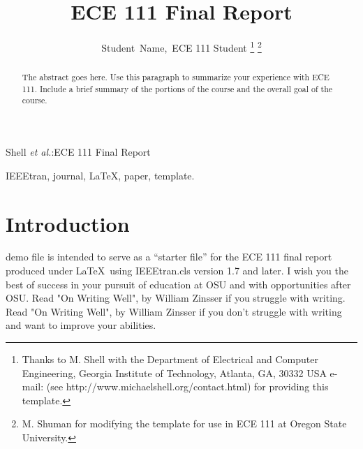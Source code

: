 \documentclass[journal]{IEEEtran}
\begin{document}
%
\title{ECE 111 Final Report}

\author{Student~Name,~ECE 111 Student
\thanks{Thanks to M. Shell with the Department
of Electrical and Computer Engineering, Georgia Institute of Technology, Atlanta,
GA, 30332 USA e-mail: (see http://www.michaelshell.org/contact.html) for providing this template.}%
\thanks{M. Shuman for modifying the template for use in ECE 111 at Oregon State University.}}

%
{Shell \MakeLowercase{\textit{et al.}}:ECE 111 Final Report}

\maketitle

\begin{abstract}
The abstract goes here.  Use this paragraph to summarize your experience with ECE 111.  Include a brief summary of the portions of the course and the overall goal of the course.
\end{abstract}

\begin{IEEEkeywords}
IEEEtran, journal, \LaTeX, paper, template.
\end{IEEEkeywords}

\section{Introduction}
% 
% 
% 
% 
 demo file is intended to serve as a ``starter file''
for the ECE 111 final report produced under \LaTeX\ using
IEEEtran.cls version 1.7 and later.
I wish you the best of success in your pursuit of education at OSU and with opportunities after OSU.  Read "On Writing Well", by William Zinsser if you struggle with writing\cite{Zinsser1976}.  Read "On Writing Well", by William Zinsser if you don't struggle with writing and want to improve your abilities.
\end{document}
